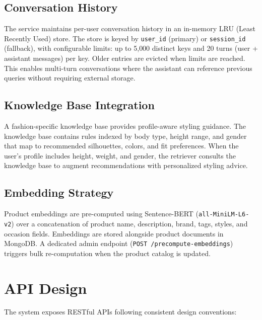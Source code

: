 \subsection{Conversation History}
The service maintains per-user conversation history in an in-memory LRU (Least Recently Used) store. The store is keyed by \texttt{user\_id} (primary) or \texttt{session\_id} (fallback), with configurable limits: up to 5{,}000 distinct keys and 20 turns (user + assistant messages) per key. Older entries are evicted when limits are reached. This enables multi-turn conversations where the assistant can reference previous queries without requiring external storage.

\subsection{Knowledge Base Integration}
A fashion-specific knowledge base provides profile-aware styling guidance. The knowledge base contains rules indexed by body type, height range, and gender that map to recommended silhouettes, colors, and fit preferences. When the user's profile includes height, weight, and gender, the retriever consults the knowledge base to augment recommendations with personalized styling advice.

\subsection{Embedding Strategy}
Product embeddings are pre-computed using Sentence-BERT (\texttt{all-MiniLM-L6-v2}) over a concatenation of product name, description, brand, tags, styles, and occasion fields. Embeddings are stored alongside product documents in MongoDB. A dedicated admin endpoint (\texttt{POST /precompute-embeddings}) triggers bulk re-computation when the product catalog is updated.

\section{API Design}

The system exposes RESTful APIs following consistent design conventions:

